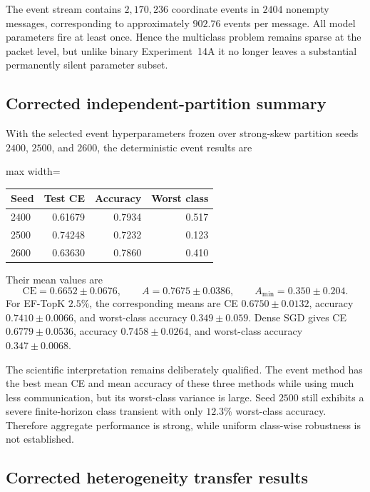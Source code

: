 The event stream contains $2{,}170{,}236$ coordinate events in $2404$ nonempty messages, corresponding to approximately $902.76$ events per message. All model parameters fire at least once. Hence the multiclass problem remains sparse at the packet level, but unlike binary Experiment~14A it no longer leaves a substantial permanently silent parameter subset.

\subsection{Corrected independent-partition summary}

With the selected event hyperparameters frozen over strong-skew partition seeds $2400$, $2500$, and $2600$, the deterministic event results are
\begin{center}
\begin{adjustbox}{max width=\textwidth}
\begin{tabular}{lrrr}
\toprule
Seed & Test CE & Accuracy & Worst class\\
\midrule
2400 & 0.61679 & 0.7934 & 0.517\\
2500 & 0.74248 & 0.7232 & 0.123\\
2600 & 0.63630 & 0.7860 & 0.410\\
\bottomrule
\end{tabular}
\end{adjustbox}
\end{center}
Their mean values are
\begin{equation}
\mathrm{CE}=0.6652\pm0.0676,\qquad
A=0.7675\pm0.0386,\qquad
A_{\min}=0.350\pm0.204.
\end{equation}
For EF-TopK $2.5\%$, the corresponding means are CE $0.6750\pm0.0132$, accuracy $0.7410\pm0.0066$, and worst-class accuracy $0.349\pm0.059$. Dense SGD gives CE $0.6779\pm0.0536$, accuracy $0.7458\pm0.0264$, and worst-class accuracy $0.347\pm0.0068$.

The scientific interpretation remains deliberately qualified. The event method has the best mean CE and mean accuracy of these three methods while using much less communication, but its worst-class variance is large. Seed $2500$ still exhibits a severe finite-horizon class transient with only $12.3\%$ worst-class accuracy. Therefore aggregate performance is strong, while uniform class-wise robustness is not established.

\subsection{Corrected heterogeneity transfer results}

